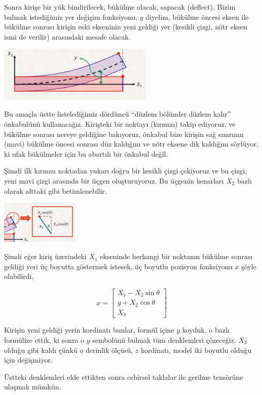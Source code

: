 \documentclass[12pt,fleqn]{article}\usepackage{../../common}
\begin{document}
Sonra kirişe bir yük bindirilecek, bükülme olacak, sapacak (deflect).  Bizim
bulmak istediğimiz yer değişim fonksiyonu, $y$ diyelim, bükülme öncesi eksen ile
bükülme sonrası kirişin eski ekseninin yeni geldiği yer (kesikli çizgi, nötr
eksen ismi de verilir) arasındaki mesafe olacak.

\includegraphics[width=20em]{phy_020_strs_02_13.jpg}

Bu amaçla üstte listelediğimiz dördüncü ``düzlem bölümler düzlem kalır''
önkabulünü kullanacağız. Kirişteki bir noktayı (kırmızı) takip ediyoruz, ve
bükülme sonrası nereye geldiğine bakıyoruz, önkabul bize kirişin sağ sınırının
(mavi) bükülme öncesi sonrası düz kaldığını ve nötr eksene dik kaldığını
söylüyor, ki ufak bükülmeler için bu abartılı bir önkabul değil.

Şimdi ilk kırmızı noktadan yukarı doğru bir kesikli çizgi çekiyoruz ve bu çizgi,
yeni mavi çizgi arasında bir üçgen oluşturuyoruz. Bu üçgenin kenarları $X_2$
bazlı olarak alttaki gibi betimlenebilir.

\includegraphics[width=10em]{phy_020_strs_02_14.jpg}

Şimdi eğer kiriş üzerindeki $X_1$ ekseninde herhangi bir noktanın bükülme
sonrası geldiği yeri üç boyutta göstermek istesek, üç boyutlu pozisyon
fonksiyonu $x$ şöyle olabilirdi,

$$
x = \left[\begin{array}{c}
X_1 - X_2 \sin \theta \\ y + X_2 \cos\theta \\ X_3
\end{array}\right]
$$

Kirişin yeni geldiği yerin kordinatı bunlar, formül içine $y$ koyduk, o bazlı
formülize ettik, ki sonra o $y$ sembolünü bulmak tüm denklemleri çözeceğiz.
$X_3$ olduğu gibi kaldı çünkü o derinlik ölçüsü, $z$ kordinatı, model iki
boyutlu olduğu için değişmiyor.

Üstteki denklemleri elde ettikten sonra cebirsel taklalar ile gerilme
tensörüne ulaşmak mümkün.
\end{document}

